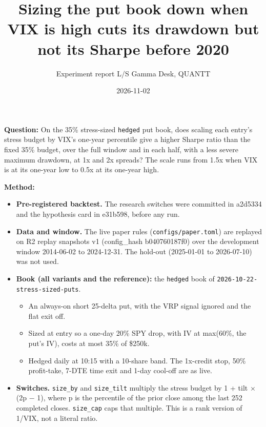 \documentclass{article}
\title{Sizing the put book down when VIX is high cuts its drawdown but not its Sharpe before 2020}
\author{Experiment report \textperiodcentered{} L/S Gamma Desk, QUANTT}
\date{2026-11-02}
\begin{document}
\maketitle

\textbf{Question:} On the 35\% stress-sized \texttt{hedged} put book, does scaling each entry's stress budget by VIX's one-year percentile give a higher Sharpe ratio than the fixed 35\% budget, over the full window and in each half, with a less severe maximum drawdown, at 1x and 2x spreads? The scale runs from 1.5x when VIX is at its one-year low to 0.5x at its one-year high.

\textbf{Method:}

\begin{itemize}

\item \textbf{Pre-registered backtest.} The research switches were committed in a2d5334 and the hypothesis card in e31b598, before any run.

\item \textbf{Data and window.} The live paper rules (\texttt{configs/\allowbreak{}paper.\allowbreak{}toml}) are replayed on R2 replay snapshots v1 (config\_hash b040760187f0) over the development window 2014-06-02 to 2024-12-31. The hold-out (2025-01-01 to 2026-07-10) was not used.

\item \textbf{Book (all variants and the reference):} the \texttt{hedged} book of \texttt{2026-\allowbreak{}10-\allowbreak{}22-\allowbreak{}stress-\allowbreak{}sized-\allowbreak{}puts}.

\begin{itemize}

\item An always-on short 25-delta put, with the VRP signal ignored and the flat exit off.

\item Sized at entry so a one-day 20\% SPY drop, with IV at max(60\%, the put's IV), costs at most 35\% of \$250k.

\item Hedged daily at 10:15 with a 10-share band. The 1x-credit stop, 50\% profit-take, 7-DTE time exit and 1-day cool-off are as live.

\end{itemize}

\item \textbf{Switches.} \texttt{size\_\allowbreak{}by} and \texttt{size\_\allowbreak{}tilt} multiply the stress budget by 1 + tilt \ensuremath{\times} (2p \ensuremath{-} 1), where p is the percentile of the prior close among the last 252 completed closes. \texttt{size\_\allowbreak{}cap} caps that multiple. This is a rank version of 1/\allowbreak{}VIX, not a literal ratio.


\end{itemize}
\end{document}
